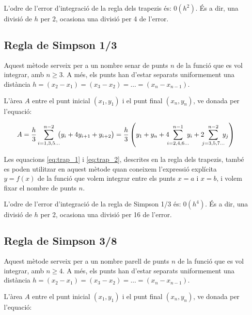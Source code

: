 L'odre de l'error d'integració de la regla dels trapezis és: $0(h^2)$. És a dir, una divisió de $h$ per 2, ocasiona una divisió per 4 de l'error.

\subsection{Regla de Simpson 1/3}

Aquest mètode serveix per a un nombre senar de punts $n$ de la funció que es vol integrar, amb $n \geq 3$. A més, els punts han d'estar separats uniformement una distància $h = (x_2-x_1) = (x_3-x_2) = \dots = (x_n-x_{n-1})$.

L'àrea $A$ entre el punt inicial $(x_1, y_1)$ i el punt final $(x_n, y_n)$, ve donada per l'equació:

 \begin{equation}\label{eq:simp_1_3}
   A =  \frac{h}{3} \sum_{i=1,3,5\dots}^{n-2} \hspace{-0.5em} \big( y_i + 4 y_{i+1} + y_{i+2} \big) =
   \frac{h}{3} \left( y_1 + y_n + 4 \hspace{-0.5em} \sum_{i=2,4,6\dots}^{n-1} \hspace{-0.5em} y_i +
   2 \hspace{-0.5em} \sum_{j=3,5,7\dots}^{n-2} \hspace{-0.5em} y_j \right)
 \end{equation}

Les equacions \eqref{eq:trap_1} i \eqref{eq:trap_2}, descrites en la regla dels trapezis, també es poden utilitzar en aquest mètode quan  coneixem l'expressió explícita $y=f(x)$ de la funció que volem integrar entre els punts $x=a$ i $x=b$, i volem fixar el nombre de punts $n$.

L'odre de l'error d'integració de la regla de Simpson 1/3 és: $0(h^4)$. És a dir, una divisió de $h$ per 2, ocasiona una divisió per 16 de l'error.

 \subsection{Regla de Simpson 3/8}

Aquest mètode serveix per a un nombre parell de punts $n$ de la funció que es vol integrar, amb $n \geq 4$. A més, els punts han d'estar separats uniformement una distància $h = (x_2-x_1) = (x_3-x_2) = \dots = (x_n-x_{n-1})$.

L'àrea $A$ entre el punt inicial $(x_1, y_1)$ i el punt final $(x_n, y_n)$, ve donada per l'equació:

